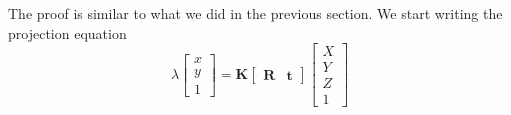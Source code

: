The proof is similar to what we did in the previous section. We start writing the projection equation
\begin{equation}
    \lambda
    \begin{bmatrix}
        x \\
        y \\
        1
    \end{bmatrix}
    =
    \mathbf{K}
    \begin{bmatrix}
        \mathbf{R} & \mathbf{t}
    \end{bmatrix}
    \begin{bmatrix}
        X \\
        Y \\
        Z \\
        1
    \end{bmatrix}
\end{equation}

